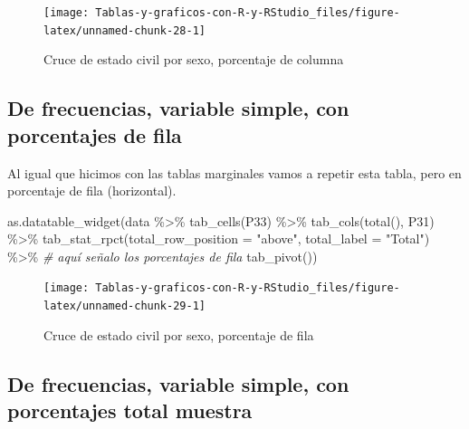 \documentclass[
]{book}
\newenvironment{Shaded}{\begin{snugshade}}{\end{snugshade}}
\newcommand{\AttributeTok}[1]{\textcolor[rgb]{0.77,0.63,0.00}{#1}}
\newcommand{\CommentTok}[1]{\textcolor[rgb]{0.56,0.35,0.01}{\textit{#1}}}
\newcommand{\FunctionTok}[1]{\textcolor[rgb]{0.00,0.00,0.00}{#1}}
\newcommand{\NormalTok}[1]{#1}
\newcommand{\SpecialCharTok}[1]{\textcolor[rgb]{0.00,0.00,0.00}{#1}}
\newcommand{\StringTok}[1]{\textcolor[rgb]{0.31,0.60,0.02}{#1}}
\begin{document}
\begin{figure}[H]

{\centering \texttt{[image: Tablas-y-graficos-con-R-y-RStudio\_files/figure-latex/unnamed-chunk-28-1]} 

}

\caption{Cruce de estado civil por sexo, porcentaje de columna}\label{fig:unnamed-chunk-28}
\end{figure}

\hypertarget{de-frecuencias-variable-simple-con-porcentajes-de-fila}{%
\subsection{De frecuencias, variable simple, con porcentajes de fila}\label{de-frecuencias-variable-simple-con-porcentajes-de-fila}}

Al igual que hicimos con las tablas marginales vamos a repetir esta tabla, pero en porcentaje de fila (horizontal).

\begin{Shaded}
\begin{Highlighting}[]
\FunctionTok{as.datatable\_widget}\NormalTok{(data }\SpecialCharTok{\%\textgreater{}\%}
    \FunctionTok{tab\_cells}\NormalTok{(P33) }\SpecialCharTok{\%\textgreater{}\%}
    \FunctionTok{tab\_cols}\NormalTok{(}\FunctionTok{total}\NormalTok{(), P31) }\SpecialCharTok{\%\textgreater{}\%}
    \FunctionTok{tab\_stat\_rpct}\NormalTok{(}\AttributeTok{total\_row\_position =} \StringTok{"above"}\NormalTok{, }\AttributeTok{total\_label =} \StringTok{"Total"}\NormalTok{) }\SpecialCharTok{\%\textgreater{}\%} \CommentTok{\# aquí señalo los porcentajes de fila}
    \FunctionTok{tab\_pivot}\NormalTok{())}
\end{Highlighting}
\end{Shaded}

\begin{figure}[H]

{\centering \texttt{[image: Tablas-y-graficos-con-R-y-RStudio\_files/figure-latex/unnamed-chunk-29-1]} 

}

\caption{Cruce de estado civil por sexo, porcentaje de fila}\label{fig:unnamed-chunk-29}
\end{figure}

\hypertarget{de-frecuencias-variable-simple-con-porcentajes-total-muestra}{%
\subsection{De frecuencias, variable simple, con porcentajes total muestra}\label{de-frecuencias-variable-simple-con-porcentajes-total-muestra}}
\end{document}
